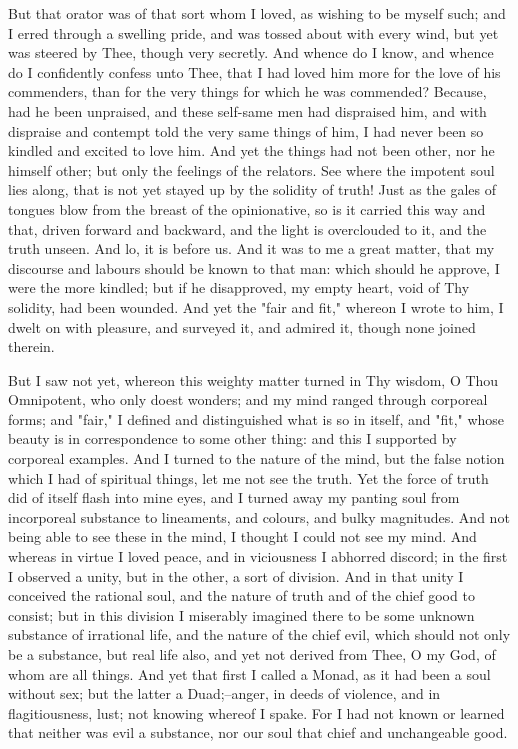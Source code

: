 \documentclass[b5paper,openright,12pt,twoside]{book}
\begin{document}
But that orator was of that sort whom I loved, as wishing to be myself
such; and I erred through a swelling pride, and was tossed about with
every wind, but yet was steered by Thee, though very secretly. And
whence do I know, and whence do I confidently confess unto Thee, that
I had loved him more for the love of his commenders, than for the very
things for which he was commended? Because, had he been unpraised, and
these self-same men had dispraised him, and with dispraise and contempt
told the very same things of him, I had never been so kindled and
excited to love him. And yet the things had not been other, nor he
himself other; but only the feelings of the relators. See where the
impotent soul lies along, that is not yet stayed up by the solidity
of truth! Just as the gales of tongues blow from the breast of the
opinionative, so is it carried this way and that, driven forward and
backward, and the light is overclouded to it, and the truth unseen. And
lo, it is before us. And it was to me a great matter, that my discourse
and labours should be known to that man: which should he approve, I were
the more kindled; but if he disapproved, my empty heart, void of Thy
solidity, had been wounded. And yet the "fair and fit," whereon I wrote
to him, I dwelt on with pleasure, and surveyed it, and admired it,
though none joined therein.

But I saw not yet, whereon this weighty matter turned in Thy wisdom,
O Thou Omnipotent, who only doest wonders; and my mind ranged through
corporeal forms; and "fair," I defined and distinguished what is so
in itself, and "fit," whose beauty is in correspondence to some other
thing: and this I supported by corporeal examples. And I turned to
the nature of the mind, but the false notion which I had of spiritual
things, let me not see the truth. Yet the force of truth did of itself
flash into mine eyes, and I turned away my panting soul from incorporeal
substance to lineaments, and colours, and bulky magnitudes. And not
being able to see these in the mind, I thought I could not see my mind.
And whereas in virtue I loved peace, and in viciousness I abhorred
discord; in the first I observed a unity, but in the other, a sort
of division. And in that unity I conceived the rational soul, and the
nature of truth and of the chief good to consist; but in this division
I miserably imagined there to be some unknown substance of irrational
life, and the nature of the chief evil, which should not only be a
substance, but real life also, and yet not derived from Thee, O my God,
of whom are all things. And yet that first I called a Monad, as it had
been a soul without sex; but the latter a Duad;--anger, in deeds of
violence, and in flagitiousness, lust; not knowing whereof I spake. For
I had not known or learned that neither was evil a substance, nor our
soul that chief and unchangeable good.
\end{document}
